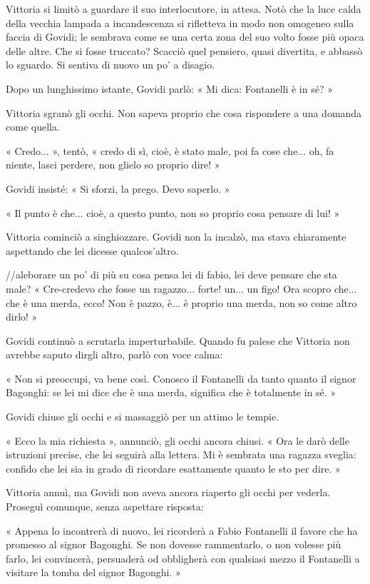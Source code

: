 Vittoria si limitò a guardare il suo interlocutore, in attesa. Notò che la luce calda della vecchia lampada a incandescenza si rifletteva in modo non omogeneo sulla faccia di Govidi; le sembrava come se una certa zona del suo volto fosse più opaca delle altre. Che si fosse truccato? Scacciò quel pensiero, quasi divertita, e abbassò lo sguardo. Si sentiva di nuovo un po' a disagio.

Dopo un lunghissimo istante, Govidi parlò: « Mi dica: Fontanelli è in sé? »

Vittoria sgranò gli occhi. Non sapeva proprio che cosa rispondere a una domanda come quella.

« Credo... », tentò, « credo di sì, cioè, è stato male, poi fa cose che... oh, fa niente, lasci perdere, non glielo so proprio dire! »

Govidi insisté: « Si sforzi, la prego. Devo saperlo. »

« Il punto è che... cioè, a questo punto, non so proprio cosa pensare di lui! »

Vittoria cominciò a singhiozzare. Govidi non la incalzò, ma stava chiaramente aspettando che lei dicesse qualcos'altro.

//aleborare un po' di più su cosa pensa lei di fabio, lei deve pensare che sta male?
« Cre-credevo che fosse un ragazzo... forte! un... un figo! Ora scopro che... che è una merda, ecco! Non è pazzo, è... è proprio una merda, non so come altro dirlo! »

Govidi continuò a scrutarla imperturbabile. Quando fu palese che Vittoria non avrebbe saputo dirgli altro, parlò con voce calma:

« Non si preoccupi, va bene così. Conosco il Fontanelli da tanto quanto il signor Bagonghi: se lei mi dice che è una merda, significa che è totalmente in sé. »

Govidi chiuse gli occhi e si massaggiò per un attimo le tempie.

« Ecco la mia richiesta », annunciò, gli occhi ancora chiusi. « Ora le darò delle istruzioni precise, che lei seguirà alla lettera. Mi è sembrata una ragazza sveglia: confido che lei sia in grado di ricordare esattamente quanto le sto per dire. »

Vittoria annuì, ma Govidi non aveva ancora riaperto gli occhi per vederla. Proseguì comunque, senza aspettare risposta:

« Appena lo incontrerà di nuovo, lei ricorderà a Fabio Fontanelli il favore che ha promesso al signor Bagonghi. Se non dovesse rammentarlo, o non volesse più farlo, lei convincerà, persuaderà od obbligherà con qualsiasi mezzo il Fontanelli a visitare la tomba del signor Bagonghi. »

